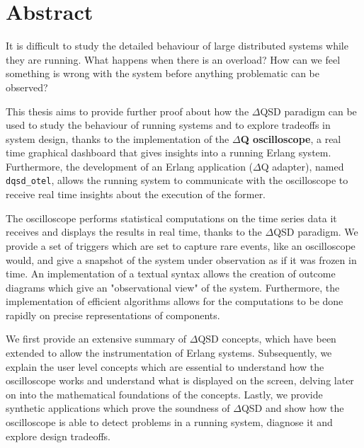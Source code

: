 \chapter*{Abstract}
    It is difficult to study the detailed behaviour of large distributed systems while they are running. What happens when there is an overload? How can we feel something is wrong with the system before anything problematic can be observed?

    This thesis aims to provide further proof about how the $\Delta$QSD paradigm can be used to study the behaviour of running systems and to explore tradeoffs in system design, thanks to the implementation of the \textbf{$\Delta$Q oscilloscope}, a real time graphical dashboard that gives insights into a running Erlang system. Furthermore, the development of an Erlang application ($\Delta$Q adapter), named \texttt{dqsd\_otel}, allows the running system to communicate with the oscilloscope to receive real time insights about the execution of the former.
    
    The oscilloscope performs statistical computations on the time series data it receives and displays the results in real time, thanks to the $\Delta$QSD paradigm. We provide a set of triggers which are set to capture rare events, like an oscilloscope would, and give a snapshot of the system under observation as if it was frozen in time. An implementation of a textual syntax allows the creation of outcome diagrams which give an "observational view" of the system. Furthermore, the implementation of efficient algorithms allows for the computations to be done rapidly on precise representations of components.

    We first provide an extensive summary of $\Delta$QSD concepts, which have been extended to allow the instrumentation of Erlang systems. Subsequently, we explain the user level concepts which are essential to understand how  the oscilloscope works and understand what is displayed on the screen, delving later on into the mathematical foundations of the concepts. Lastly, we provide synthetic applications which prove the soundness of $\Delta$QSD and show how the oscilloscope is able to detect problems in a running system, diagnose it and explore design tradeoffs.



